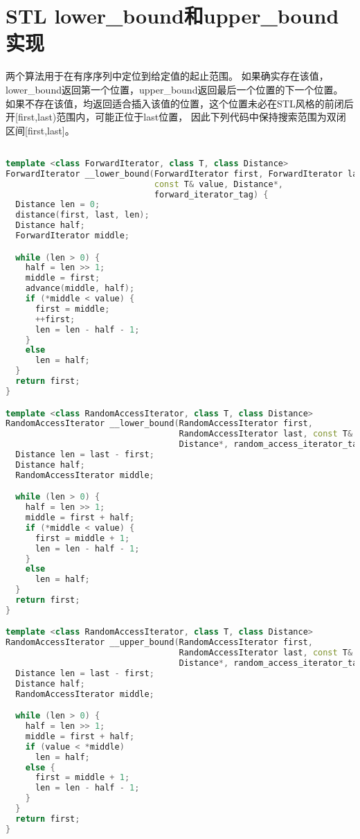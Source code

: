 \section{STL lower\_bound和upper\_bound实现}

两个算法用于在有序序列中定位到给定值的起止范围。
如果确实存在该值，lower\_bound返回第一个位置，upper\_bound返回最后一个位置的下一个位置。
如果不存在该值，均返回适合插入该值的位置，这个位置未必在STL风格的前闭后开[first,last)范围内，可能正位于last位置，
因此下列代码中保持搜索范围为双闭区间[first,last]。

\begin{lstlisting}[language=C++]

template <class ForwardIterator, class T, class Distance>
ForwardIterator __lower_bound(ForwardIterator first, ForwardIterator last,
                              const T& value, Distance*,
                              forward_iterator_tag) {
  Distance len = 0;
  distance(first, last, len);
  Distance half;
  ForwardIterator middle;

  while (len > 0) {
    half = len >> 1;
    middle = first;
    advance(middle, half);
    if (*middle < value) {
      first = middle;
      ++first;
      len = len - half - 1;
    }
    else
      len = half;
  }
  return first;
}

template <class RandomAccessIterator, class T, class Distance>
RandomAccessIterator __lower_bound(RandomAccessIterator first,
                                   RandomAccessIterator last, const T& value,
                                   Distance*, random_access_iterator_tag) {
  Distance len = last - first;
  Distance half;
  RandomAccessIterator middle;

  while (len > 0) {
    half = len >> 1;
    middle = first + half;
    if (*middle < value) {
      first = middle + 1;
      len = len - half - 1;
    }
    else
      len = half;
  }
  return first;
}

template <class RandomAccessIterator, class T, class Distance>
RandomAccessIterator __upper_bound(RandomAccessIterator first,
                                   RandomAccessIterator last, const T& value,
                                   Distance*, random_access_iterator_tag) {
  Distance len = last - first;
  Distance half;
  RandomAccessIterator middle;

  while (len > 0) {
    half = len >> 1;
    middle = first + half;
    if (value < *middle)
      len = half;
    else {
      first = middle + 1;
      len = len - half - 1;
    }
  }
  return first;
}


\end{lstlisting}
